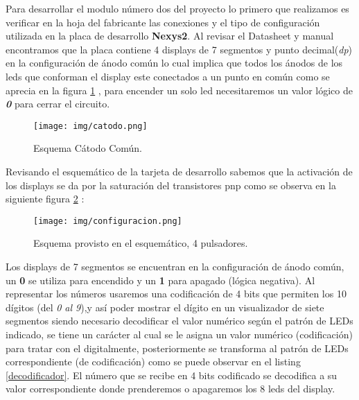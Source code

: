 \documentclass[a4paper]{article}
\begin{document}
Para desarrollar el modulo número dos del proyecto lo primero que realizamos es verificar en la hoja del fabricante las conexiones y el tipo de configuración utilizada en la placa de desarrollo \textbf{Nexys2}. Al revisar el Datasheet y manual encontramos que la placa contiene 4 displays de 7 segmentos y punto decimal(\textit{dp})  en la configuración de ánodo común lo cual implica que todos los ánodos de los leds que conforman el display este conectados a un punto en común como se aprecia en la figura \ref{fig:catodo} , para encender un solo led necesitaremos un valor lógico de \textbf{\textit{0}} para cerrar el circuito. 
\begin{figure}[H]
  \centering
     \texttt{[image: img/catodo.png]}
  \caption{Esquema Cátodo Común.}
    \label{fig:catodo}
\end{figure}
Revisando el esquemático de la tarjeta de desarrollo sabemos que la activación de los displays se da por la saturación del transistores pnp como se observa en la siguiente figura \ref{fig:esquema} :
\begin{figure}[H]
  \centering
     \texttt{[image: img/configuracion.png]}
  \caption{Esquema provisto en el esquemático, 4 pulsadores.}
    \label{fig:esquema}
\end{figure}
Los displays de 7 segmentos se encuentran en la configuración de ánodo común, un \textbf{0} se utiliza para encendido y un \textbf{1} para apagado (lógica negativa). Al representar los números usaremos una codificación de 4 bits que permiten los 10 dígitos (del \textit{0 al 9}),y así poder mostrar el dígito en un visualizador de siete segmentos siendo necesario decodificar el valor numérico según el patrón de LEDs indicado,  se tiene un carácter al cual se le asigna un valor numérico (codificación) para tratar con el digitalmente, posteriormente se transforma al patrón de LEDs correspondiente (de codificación) como se puede observar en el listing \ref{decodificador}. El número que se recibe en 4 bits codificado se decodifica a su valor correspondiente donde prenderemos o apagaremos los 8 leds del display.
\end{document}

